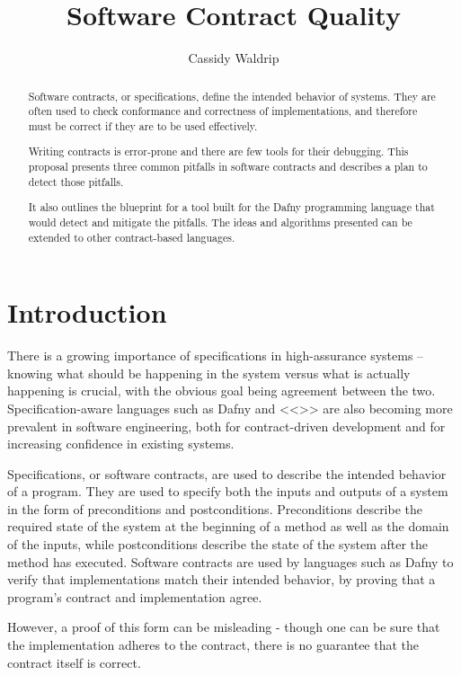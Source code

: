 \documentclass{article}
\title{Software Contract Quality}
\author{Cassidy Waldrip}
\newif\ifcomments
\newcommand{\egm}[1]{\ifcomments\textcolor{orange}{egm: #1}\fi}
\begin{document}
\maketitle

\begin{abstract}

Software contracts, or specifications, define the intended behavior of systems. They are often used to check
conformance and correctness of implementations, and therefore must be correct if they are to be used effectively.
\egm{Would it be better to use the term \emph{safe substitution}? So contracts are a declarative statement of computation and tools such as Dafny prove that an implementation is a safe substitution for the contract? Safe substitution would need to be defined informally.}
Writing contracts is error-prone and there are few tools for their debugging. This proposal presents three common
pitfalls in software contracts and describes a plan to detect those pitfalls.
\egm{I might suggest that the three common pitfalls be stated here intuitively.}
It also outlines the
blueprint for a tool built for the Dafny programming language that would detect and mitigate the pitfalls. The ideas
and algorithms presented can be extended to other contract-based languages.
\egm{Give an intuitive definition of Dafny (same for other terms). The introduction can give a proper defininition of each of the concepts mentioned in the abstract.}

\end{abstract}

\section{Introduction}

There is a growing importance of specifications in high-assurance systems – knowing what should be happening
in the system versus what is actually happening is crucial, with the obvious goal being agreement
between the two. Specification-aware languages such as Dafny \cite{dafny} and <<>> are also becoming more prevalent in
software engineering, both for contract-driven development and for increasing confidence in existing systems.

Specifications, or software contracts, are used to describe the intended behavior of a program. They are used
to specify both the inputs and outputs of a system in the form of preconditions and postconditions. Preconditions
describe the required state of the system at the beginning of a method as well as the domain of the inputs,
while postconditions describe the state of the system after the method has executed. Software contracts
are used by languages such as Dafny to verify that implementations match their intended behavior, by proving
that a program’s contract and implementation agree.
\egm{I might suggest using \emph{safe substitution} above since Dafny proves an implementation is a safe substitution for a contract. It follows the Liskov principle---all need to be defined.}
However, a proof of this form can be misleading - though
one can be sure that the implementation adheres to the contract, there is no guarantee that the contract itself
is correct.
\egm{Maybe, no guarantees that the contract itself is not without defects?}
\end{document}
